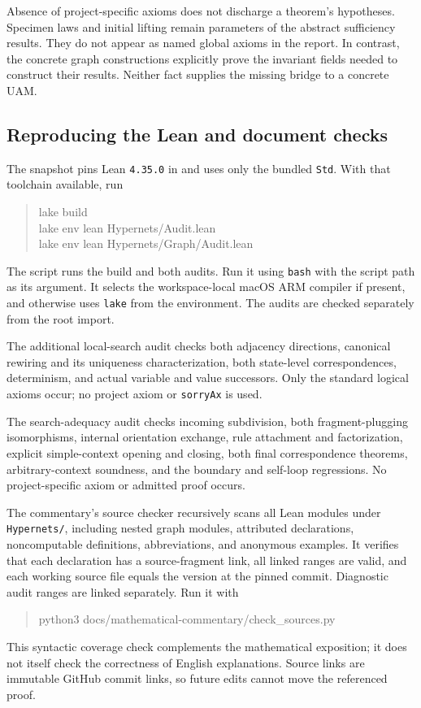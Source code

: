 Absence of project-specific axioms does not discharge a theorem's hypotheses.
Specimen laws and initial lifting remain parameters of the abstract sufficiency
results. They do not appear as named global axioms in the report. In contrast,
the concrete graph constructions explicitly prove the invariant fields needed
to construct their results. Neither fact supplies the missing bridge to a
concrete UAM.

\subsection{Reproducing the Lean and document checks}
The snapshot pins Lean \texttt{4.35.0} in
 and uses only the bundled \texttt{Std}.
With that toolchain available, run
\begin{quote}\ttfamily
lake build\\
lake env lean Hypernets/Audit.lean\\
lake env lean Hypernets/Graph/Audit.lean
\end{quote}
The script  runs the build and both
audits. Run it using \texttt{bash} with the script path as its argument. It selects
the workspace-local
macOS ARM compiler if present, and otherwise uses \texttt{lake} from the environment.
The audits are checked separately from the root import.

The additional local-search audit checks both adjacency directions, canonical
rewiring and its uniqueness characterization, both state-level correspondences,
determinism, and actual variable and value successors. Only the standard
logical axioms occur; no project axiom or \texttt{sorryAx} is used.

The search-adequacy audit checks incoming subdivision, both fragment-plugging
isomorphisms, internal orientation exchange, rule attachment and factorization,
explicit simple-context opening and closing, both final correspondence
theorems, arbitrary-context soundness, and the boundary and self-loop regressions.
No project-specific axiom or admitted proof occurs.

The commentary's source checker recursively scans all Lean modules under
\texttt{Hypernets/}, including nested graph modules, attributed declarations,
noncomputable definitions, abbreviations, and anonymous examples. It verifies
that each declaration has a source-fragment link, all linked ranges are valid,
and each working source file equals the version at the pinned commit. Diagnostic
audit ranges are linked separately. Run it with
\begin{quote}\ttfamily\small
python3 docs/mathematical-commentary/check\_sources.py
\end{quote}
This syntactic coverage check complements the mathematical exposition; it does
not itself check the correctness of English explanations. Source links are
immutable GitHub commit links, so future edits cannot move the referenced proof.

